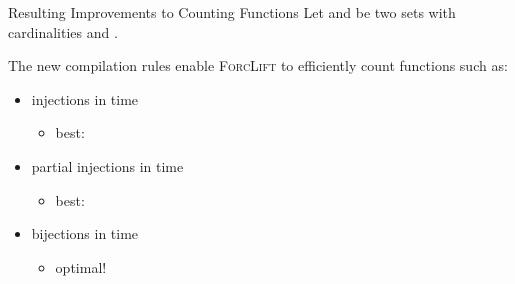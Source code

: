 \documentclass{beamer}
\begin{document}

\begin{frame}{Resulting Improvements to Counting Functions}
  Let  and  be two sets with cardinalities
   and .

  The new compilation rules enable \textsc{ForcLift} to efficiently count
   functions such as:
  \begin{itemize}
    \item injections in  time
          \begin{itemize}
            \item best: 
          \end{itemize}
    \item partial injections in  time
          \begin{itemize}
            \item best: 
          \end{itemize}
          \item bijections in  time
          \begin{itemize}
            \item \alert{optimal!}
          \end{itemize}
  \end{itemize}
\end{frame}
\end{document}
